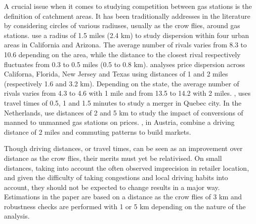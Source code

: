 \documentclass[english]{article}
\begin{document}
A crucial issue when it comes to studying competition between gas stations is the definition of catchment areas. It has been traditionally addresses in the literature by considering circles of various radiuses, usually as the crow flies, around gas stations. \cite{BAR04} use a radius of 1.5 miles (2.4 km) to study dispersion within four urban areas in California and Arizona. The average number of rivals varies from 8.3 to 10.6 depending on the area, while the distance to the closest rival respectively fluctuates from 0.3 to 0.5 miles (0.5 to 0.8 km). \cite{TAP11} analyses price dispersion across Californa, Florida, New Jersey and Texas using distances of 1 and 2 miles (respectively 1.6 and 3.2 km). Depending on the state, the average number of rivals varies from 4.3 to 4.6 with 1 mile and from 13.5 to 14.2 with 2 miles. \cite{HOU12}, uses travel times of 0.5, 1 and 1.5 minutes to study a merger in Quebec city. In the Netherlands, \cite{BRU15} use distances of 2 and 5 km to study the impact of conversions of manned to unmanned gas stations on prices. \cite{PEN15}, in Austria, combine a driving distance of 2 miles and commuting patterns to build markets.

Though driving distances, or travel times, can be seen as an improvement over distance as the crow flies, their merits must yet be relativised. On small distances, taking into account the often observed imprecision in retailer location, and given the difficulty of taking congestions and local driving habits into account, they should not be expected to change results in a major way. Estimations in the paper are based on a distance as the crow flies of 3 km and robustness checks are performed with 1 or 5 km depending on the nature of the analysis.
\end{document}
